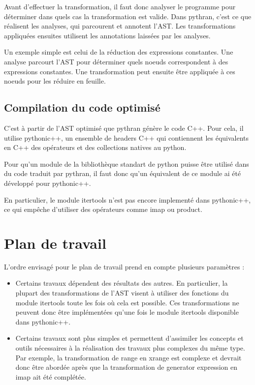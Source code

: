 \documentclass[a4paper]{article}
\begin{document}
Avant d'effectuer la transformation, il faut donc analyser le programme pour déterminer dans quels cas la transformation est valide. Dans pythran, c'est ce que réalisent les analyses, qui parcourent et annotent l'AST. Les transformations appliquées ensuites utilisent les annotations laissées par les analyses.

Un exemple simple est celui de la réduction des expressions constantes. Une analyse parcourt l'AST pour déterminer quels noeuds correspondent à des expressions constantes. Une transformation peut ensuite être appliquée à ces noeuds pour les réduire en feuille.

\subsection{Compilation du code optimisé}

\label{pythonicpp}

C'est à partir de l'AST optimisé que pythran génère le code C++. Pour cela, il utilise pythonic++, un ensemble de headers C++ qui contiennent les équivalents en C++ des opérateurs et des collections natives au python. 

Pour qu'un module de la bibliothèque standart de python puisse être utilisé dans du code traduit par pythran, il faut donc qu'un équivalent de ce module ai été développé pour pythonic++.

En particulier, le module itertools n'est pas encore implementé dans pythonic++, ce qui empêche d'utiliser des opérateurs comme imap ou product.

\section{Plan de travail}

L'ordre envisagé pour le plan de travail prend en compte plusieurs paramètres :

\begin{itemize}
\item Certains travaux dépendent des résultats des autres. En particulier, la plupart des transformations de l'AST visent à utiliser des fonctions du module itertools toute les fois où cela est possible. Ces transformations ne peuvent donc être implémentées qu'une fois le module itertools disponible dans pythonic++.
\item Certains travaux sont plus simples et permettent d'assimiler les concepts et outils nécessaires à la réalisation des travaux plus complexes du même type. Par exemple, la transformation de range en xrange est complexe et devrait donc être abordée après que la transformation de generator expression en imap ait été complétée.
\end{itemize}
\end{document}
